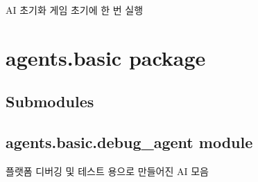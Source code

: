 \documentclass[letterpaper,10pt,english]{sphinxmanual}
\begin{document}
\begin{fulllineitems}
\begin{fulllineitems}
\end{fulllineitems}


\begin{fulllineitems}
\label{\detokenize{agents:agents.BaseAgent.reset}}
AI 초기화
게임 초기에 한 번 실행

\end{fulllineitems}


\end{fulllineitems}



\section{agents.basic package}
\label{\detokenize{agents.basic:agents-basic-package}}\label{\detokenize{agents.basic::doc}}

\subsection{Submodules}
\label{\detokenize{agents.basic:submodules}}

\subsection{agents.basic.debug\_agent module}
\label{\detokenize{agents.basic:agents-basic-debug-agent-module}}\label{\detokenize{agents.basic:module-agents.basic.debug_agent}}
플랫폼 디버깅 및 테스트 용으로 만들어진 AI 모음
\end{document}
